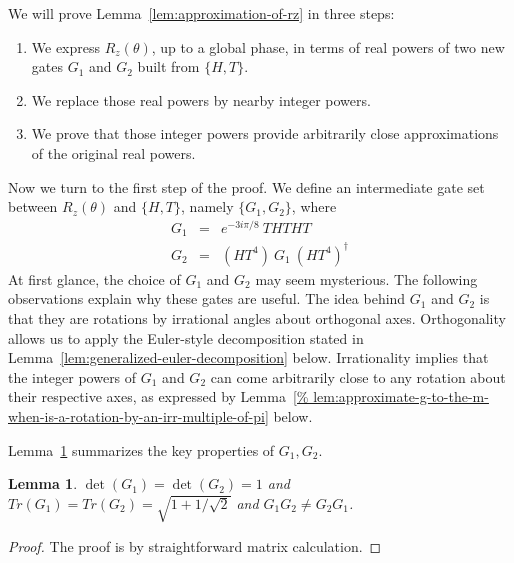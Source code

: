 \documentclass[11pt]{article}
\def\({\begin{eqnarray*}}
\def\){\end{eqnarray*}}
\newtheorem{lemma}[theorem]{Lemma}
\begin{document}
We will prove Lemma~\ref{lem:approximation-of-rz} in three steps:
\begin{enumerate}
\item We express $R_z(\theta)$, up to a global phase, in terms of
real powers of two new gates $G_1$ and $G_2$ built from $\{H,T\}$.
\item We replace those real powers by nearby integer powers.
\item We prove that those integer powers provide arbitrarily close
approximations of the original real powers.
\end{enumerate}
%
Now we turn to the first step of the proof.
We define an intermediate gate set between $R_z(\theta)$ and
$\{H, T\}$, namely $\{G_1,G_2\}$, where
\(
G_1 &=& e^{-3i\pi/8}\ THTHT \\
G_2 &=& (HT^4)\ G_1\ (HT^4)^\dagger
\)
At first glance, the choice of $G_1$ and $G_2$ may seem mysterious. 
The following observations explain why these gates are useful.
The idea behind $G_1$ and $G_2$ is that 
they are rotations by irrational angles about orthogonal axes.
Orthogonality allows us to apply the Euler-style decomposition stated in
Lemma~\ref{lem:generalized-euler-decomposition} below.
Irrationality implies that the integer powers of $G_1$ and $G_2$ can come 
arbitrarily close to any rotation about their respective axes, 
as expressed by Lemma~\ref{%
lem:approximate-g-to-the-m-when-is-a-rotation-by-an-irr-multiple-of-pi} 
below.

Lemma~\ref{lem:properties-of-g1-g2} summarizes the key properties of $G_1,G_2$.

\begin{lemma}
\label{lem:properties-of-g1-g2}
$\det(G_1) = \det(G_2) = 1$ and
$Tr(G_1) = Tr(G_2) = \sqrt{1 + 1/\sqrt{2}}$ and 
$G_1G_2 \neq G_2G_1$.
\end{lemma}

\begin{proof}
The proof is by straightforward matrix calculation.
\end{proof}
\end{document}

